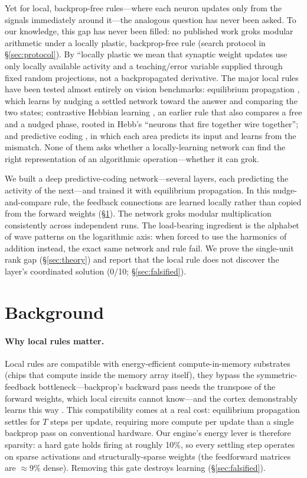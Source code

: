 \documentclass[11pt]{article}
\begin{document}
Yet for local, backprop-free rules---where each neuron updates only from the signals immediately around it---the analogous question has never been asked. To our knowledge, this gap has never been filled: no published work groks modular arithmetic under a locally plastic, backprop-free rule (search protocol in \S\ref{sec:protocol}). By ``locally plastic we mean that synaptic weight updates use only locally available activity and a teaching/error variable supplied through fixed random projections, not a backpropagated derivative. The major local rules have been tested almost entirely on vision benchmarks: equilibrium propagation \cite{scellier2017}, which learns by nudging a settled network toward the answer and comparing the two states; contrastive Hebbian learning \cite{hoier2023,hoier2024}, an earlier rule that also compares a free and a nudged phase, rooted in Hebb's ``neurons that fire together wire together''; and predictive coding \cite{sacramento2018}, in which each area predicts its input and learns from the mismatch. None of them asks whether a locally-learning network can find the right representation of an algorithmic operation---whether it can grok.

We built a deep predictive-coding network---several layers, each predicting the activity of the next---and trained it with equilibrium propagation. In this nudge-and-compare rule, the feedback connections are learned locally rather than copied from the forward weights (\S\ref{sec:background}). The network groks modular multiplication consistently across independent runs. The load-bearing ingredient is the alphabet of wave patterns on the logarithmic axis: when forced to use the harmonics of addition instead, the exact same network and rule fail. We prove the single-unit rank gap (\S\ref{sec:theory}) and report that the local rule does not discover the layer's coordinated solution (0/10; \S\ref{sec:falsified}).

\section{Background}\label{sec:background}
\paragraph{Why local rules matter.}
Local rules are compatible with energy-efficient compute-in-memory substrates (chips that compute inside the memory array itself), they bypass the symmetric-feedback bottleneck---backprop's backward pass needs the transpose of the forward weights, which local circuits cannot know---and the cortex demonstrably learns this way \cite{urbanczik2014,guerguiev2017,sacramento2018}. This compatibility comes at a real cost: equilibrium propagation settles for $T$ steps per update, requiring more compute per update than a single backprop pass on conventional hardware. Our engine's energy lever is therefore sparsity: a hard gate holds firing at roughly 10\%, so every settling step operates on sparse activations and structurally-sparse weights (the feedforward matrices are $\approx$9\% dense). Removing this gate destroys learning (\S\ref{sec:falsified}).
\end{document}
